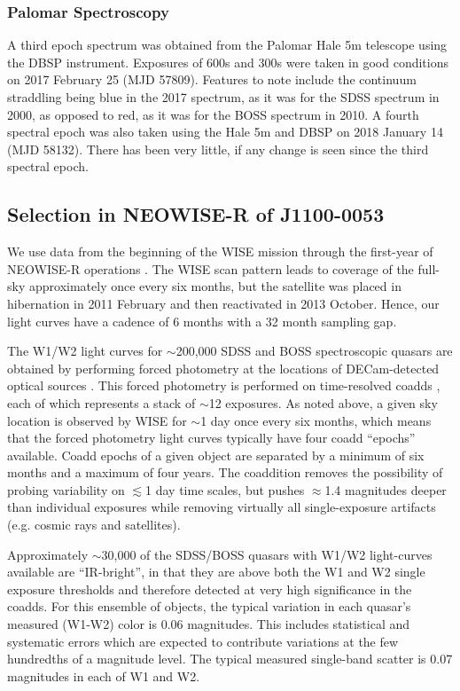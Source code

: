 \documentclass[11pt,a4paper]{article}
\begin{document}
\subsubsection{Palomar Spectroscopy} 
A third epoch spectrum was obtained from the Palomar Hale 5m telescope
using the DBSP instrument.  Exposures of 600s and 300s were taken in
good conditions on 2017 February 25 (MJD 57809). Features to note
include the continuum straddling \mgii being blue in the 2017
spectrum, as it was for the SDSS spectrum in 2000, as opposed to red,
as it was for the BOSS spectrum in 2010. A fourth spectral epoch was
also taken using the Hale 5m and DBSP on 2018 January 14 (MJD
58132). There has been very little, if any change is seen since the
third spectral epoch.


\subsection{Selection in NEOWISE-R of J1100-0053}
We use data from the beginning of the WISE mission \citep[2010
January; ][]{Wright2010} through the first-year of NEOWISE-R
operations \citep[2014 December; ][]{Mainzer2011}. The WISE scan
pattern leads to coverage of the full-sky approximately once every six
months, but the satellite was placed in hibernation in 2011 February
and then reactivated in 2013 October. Hence, our light curves have a
cadence of 6 months with a 32 month sampling gap.

The W1/W2 light curves for $\sim$200,000 SDSS and BOSS spectroscopic
quasars are obtained by performing forced photometry at the locations
of DECam-detected optical sources \citep{Lang2014, Meisner2017a,
Meisner2017b}. This forced photometry is performed on time-resolved
coadds \citep{Lang2014}, each of which represents a stack of $\sim$12
exposures. As noted above, a given sky location is observed by WISE
for $\sim$1 day once every six months, which means that the forced
photometry light curves typically have four coadd ``epochs''
available. Coadd epochs of a given object are separated by a minimum
of six months and a maximum of four years. The coaddition removes the
possibility of probing variability on $\lesssim$1 day time scales, but
pushes $\approx$1.4 magnitudes deeper than individual exposures while
removing virtually all single-exposure artifacts (e.g. cosmic rays and
satellites).

Approximately $\sim$30,000 of the SDSS/BOSS quasars with W1/W2
light-curves available are ``IR-bright'', in that they are above both
the W1 and W2 single exposure thresholds and therefore detected at
very high significance in the coadds. For this ensemble of objects,
the typical variation in each quasar's measured (W1-W2) color is 0.06
magnitudes.  This includes statistical and systematic errors which are
expected to contribute variations at the few hundredths of a magnitude
level. The typical measured single-band scatter is 0.07 magnitudes in
each of W1 and W2.
\end{document}
